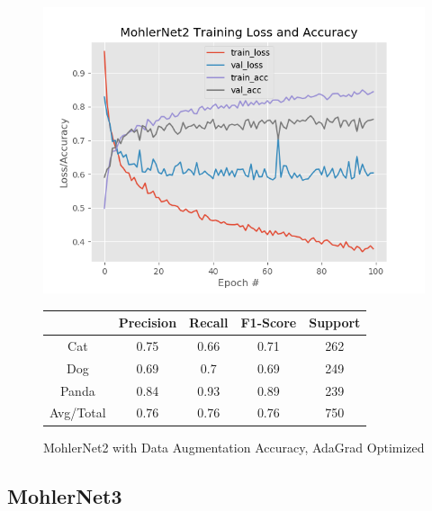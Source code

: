 \documentclass[12pt]{article}
\begin{document}
\begin{figure}[h]
	\centering %
	\captionsetup{justification=centering}
	\begin{minipage}{0.5\textwidth}
		\centering %
		\includegraphics[width=1\textwidth]{MohlerNet2_opt-AdaGradAugment_KEEP.png}
		\caption{MohlerNet2 with Data Augmentation Accuracy, AdaGrad Optimized} \label{MN2Aug}
	\end{minipage}\hfill
	\begin{minipage}{0.5\textwidth}
		\begin{center}
			\begin{tabular}[5pt]{| c| c| c| c|c|}
				\hline
				& Precision & Recall & F1-Score & Support \\[0.5ex] 
				\hline 	
				Cat   &    0.75&	0.66&	0.71&	262\\ \hline 
				Dog    &   0.69&	0.7&	0.69&	249    \\ \hline 
				Panda   &   0.84&	0.93&	0.89&	239    \\ \hline 
				Avg/Total  &    0.76&	0.76&	0.76&	750\\ \hline 
				
			\end{tabular}
			\label{MN2RAug}
		\end{center}	
	\end{minipage}
\end{figure}

\subsection{MohlerNet3}
\end{document}
